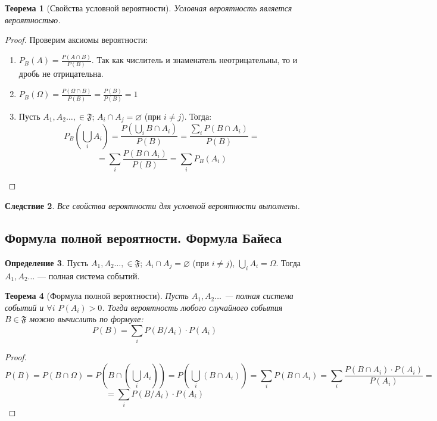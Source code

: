 \documentclass[11pt,openany,a4paper]{scrartcl}
\theoremstyle{plain}
\newtheorem{theorem}{Теорема}[subsection]
\newtheorem{corollary}[theorem]{Следствие}
\theoremstyle{definition}
\newtheorem{definition}[theorem]{Определение}
\begin{document}
\begin{theorem}[Свойства условной вероятности]
    Условная вероятность является вероятностью.
\end{theorem}
\begin{proof}
    Проверим аксиомы вероятности:
    \begin{enumerate}
        \item $P_B(A) =  \frac{P(A \cap B)}{P(B)}$. Так как числитель и знаменатель 
        неотрицательны, то и дробь не отрицательна.
        \item $P_B(\Omega) = \frac{P(\Omega \cap B)}{P(B)} =  \frac{P(B)}{P(B)} = 1$
        \item Пусть $A_1, A_2 \ldots, \in \mathfrak{F}$;
        $A_i \cap A_j = \varnothing$ (при $i \neq j$). Тогда:
        $$
        P_B(\bigcup\limits_i A_i) =
        \frac{P(\bigcup\limits_i B\cap A_i)}{P(B)} =
        \frac{\sum\limits_i P(B \cap A_i)}{P(B)} =
        $$
        $$
        = \sum\limits_i \frac{P(B\cap A_i)}{P(B)} = \sum\limits_i P_B(A_i)
        $$
    \end{enumerate}
\end{proof}
\begin{corollary}
    Все свойства вероятности для условной вероятности выполнены.
\end{corollary}

\subsection{Формула полной вероятности. Формула Байеса}
\begin{definition}
    Пусть $A_1, A_2 \ldots, \in \mathfrak{F}$; $A_i \cap A_j = \varnothing$
    (при $i \neq j$), $\bigcup\limits_i A_i = \Omega$. Тогда $A_1, A_2 \ldots$ — полная
    система событий.
\end{definition}
\begin{theorem}[Формула полной вероятности]
    Пусть $A_1, A_2 \ldots$ — полная система событий и $\forall i$ $P(A_i) > 0$. Тогда
    вероятность любого случайного события $B \in \mathfrak{F}$ можно вычислить
    по формуле:
    $$
    P(B) = \sum_i P(B/A_i) \cdot P(A_i)
    $$
\end{theorem}
\begin{proof}
    $$
    P(B) = P(B \cap \Omega) = P(B \cap (\bigcup_i A_i)) = P(\bigcup_i (B \cap A_i)) =
    \sum_i P(B \cap A_i) = \sum_i\frac{P(B \cap A_i) \cdot P(A_i)}{P(A_i)} =
    $$
    $$
    = \sum_i P(B/A_i) \cdot P(A_i)
    $$
\end{proof}
\end{document}
